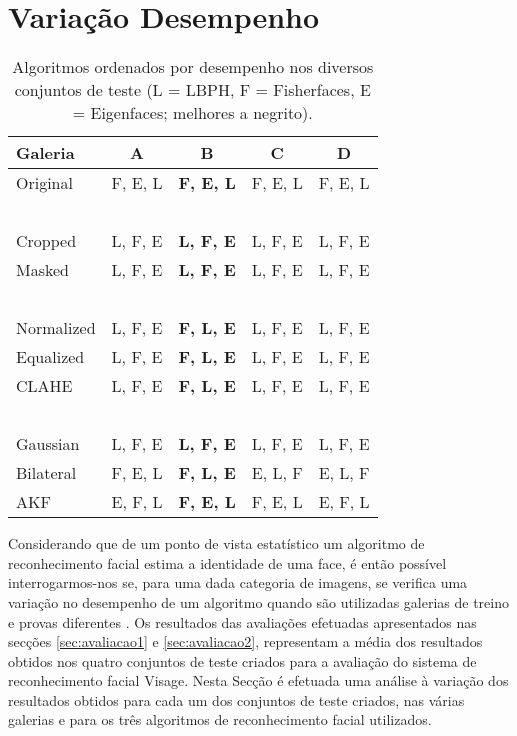 \section{Variação Desempenho} \label{sec:variacaodesempenho}
\begin{center}
\begin{table}[ht]
    \begin{center}
    \caption{Algoritmos ordenados por desempenho nos diversos conjuntos de teste (L = LBPH, F = Fisherfaces, E = Eigenfaces; melhores a negrito).}
    \begin{tabular}{l|cccc}
    Galeria    & A & B & C & D \\ 
    \hline\hline
    Original   & F, E, L          &\textbf{F, E, L}           & F, E, L           & F, E, L    \\
    ~ \\
    Cropped    & L, F, E          & \textbf{L, F, E}          & L, F, E           & L, F, E    \\
    Masked     & L, F, E          & \textbf{L, F, E}          & L, F, E           & L, F, E    \\
    ~ \\
    Normalized & L, F, E          &\textbf{ F, L, E}          & L, F, E           & L, F, E    \\
    Equalized  & L, F, E          &\textbf{ F, L, E}          & L, F, E           & L, F, E    \\
    CLAHE      & L, F, E          &\textbf{ F, L, E}          & L, F, E           & L, F, E    \\
    ~ \\
    Gaussian   & L, F, E          &\textbf{ L, F, E}          & L, F, E           & L, F, E    \\
    Bilateral  & F, E, L          &\textbf{ F, L, E}          & E, L, F           & E, L, F    \\
    AKF        & E, F, L          &\textbf{ F, E, L}          & F, E, L           & E, F, L    \\
    \hline\hline
    \end{tabular}
    \label{tab:ordem_algoritmos}
    \end{center}
\end{table}
\end{center}

Considerando que de um ponto de vista estatístico um algoritmo de reconhecimento facial estima a identidade de uma face, é então possível interrogarmos-nos se, para uma dada categoria de imagens, se verifica uma variação no desempenho de um algoritmo quando são utilizadas galerias de treino e provas diferentes \cite{Phillips2000}. Os resultados das avaliações efetuadas apresentados nas secções \ref{sec:avaliacao1} e \ref{sec:avaliacao2}, representam a média dos resultados obtidos nos quatro conjuntos de teste criados para a avaliação do sistema de reconhecimento facial Visage. Nesta Secção é efetuada uma análise à variação dos resultados obtidos para cada um dos conjuntos de teste criados, nas várias galerias e para os três algoritmos de reconhecimento facial utilizados.

